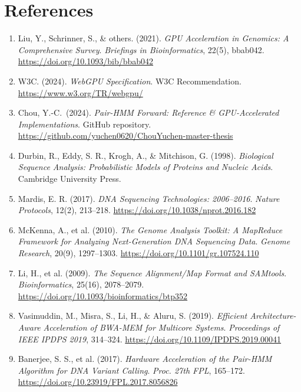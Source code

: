 \documentclass[PhD]{PHlab-thesis}
\begin{document}
\chapter{References}
\begin{enumerate}
  \item Liu, Y., Schrinner, S., \& others. (2021). \emph{GPU Acceleration in Genomics: A Comprehensive Survey}. \textit{Briefings in Bioinformatics}, 22(5), bbab042. \url{https://doi.org/10.1093/bib/bbab042}

  \item W3C. (2024). \emph{WebGPU Specification}. W3C Recommendation. \url{https://www.w3.org/TR/webgpu/}

  \item Chou, Y.-C.\ (2024). \emph{Pair-HMM Forward: Reference \& GPU-Accelerated Implementations}. GitHub repository. \url{https://github.com/yuchen0620/ChouYuchen-master-thesis}

  \item Durbin, R., Eddy, S. R., Krogh, A., \& Mitchison, G. (1998). \emph{Biological Sequence Analysis: Probabilistic Models of Proteins and Nucleic Acids}. Cambridge University Press.

  \item Mardis, E. R. (2017). \emph{DNA Sequencing Technologies: 2006–2016}. \textit{Nature Protocols}, 12(2), 213–218. \url{https://doi.org/10.1038/nprot.2016.182}

  \item McKenna, A., et al. (2010). \emph{The Genome Analysis Toolkit: A MapReduce Framework for Analyzing Next-Generation DNA Sequencing Data}. \textit{Genome Research}, 20(9), 1297–1303. \url{https://doi.org/10.1101/gr.107524.110}

  \item Li, H., et al. (2009). \emph{The Sequence Alignment/Map Format and SAMtools}. \textit{Bioinformatics}, 25(16), 2078–2079. \url{https://doi.org/10.1093/bioinformatics/btp352}

  \item Vasimuddin, M., Misra, S., Li, H., \& Aluru, S. (2019). \emph{Efficient Architecture-Aware Acceleration of BWA-MEM for Multicore Systems}. \textit{Proceedings of IEEE IPDPS 2019}, 314–324. \url{https://doi.org/10.1109/IPDPS.2019.00041}

  \item Banerjee, S. S., et al. (2017). \emph{Hardware Acceleration of the Pair-HMM Algorithm for DNA Variant Calling}. \textit{Proc. 27th FPL}, 165–172. \url{https://doi.org/10.23919/FPL.2017.8056826}


\end{enumerate}
\end{document}
